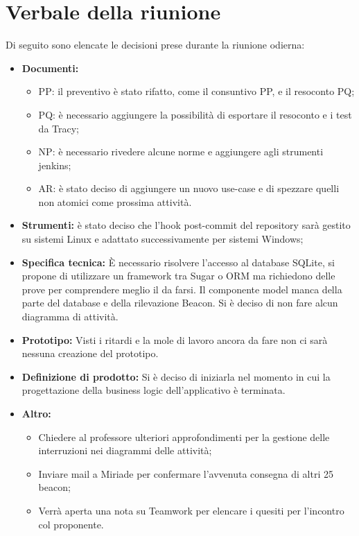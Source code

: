 \documentclass[../RiunioneInterna16-02-19.tex]{subfiles}
\begin{document}
\section{Verbale della riunione}
Di seguito sono elencate le decisioni prese durante la riunione odierna:
\begin{itemize}
\item \textbf{Documenti:}
	\begin{itemize}
		\item PP: il preventivo è stato rifatto, come il consuntivo PP, e il resoconto PQ;
		\item PQ: è necessario aggiungere la possibilità di esportare il resoconto e i test da Tracy;
		\item NP: è necessario rivedere alcune norme e aggiungere agli strumenti jenkins;
		\item AR: è stato deciso di aggiungere un nuovo use-case e di spezzare quelli non atomici come prossima attività.
	\end{itemize}		
		
\item \textbf{Strumenti:} è stato deciso che l'hook post-commit del repository sarà gestito su sistemi Linux e adattato successivamente per sistemi Windows;


\item \textbf{Specifica tecnica:}
	È necessario risolvere l'accesso al database SQLite, si propone di utilizzare un framework tra Sugar o ORM ma richiedono delle prove per comprendere meglio il da farsi.
	Il componente model manca della parte del database e della rilevazione Beacon. Si è deciso di non fare alcun diagramma di attività.
	
	
\item \textbf{Prototipo:}
	Visti i ritardi e la mole di lavoro ancora da fare non ci sarà nessuna creazione del prototipo.

\item \textbf{Definizione di prodotto:}
	Si è deciso di iniziarla nel momento in cui la progettazione della business logic dell'applicativo è terminata.
	
\item \textbf{Altro:}
	\begin{itemize}
		\item Chiedere al professore ulteriori approfondimenti per la gestione delle interruzioni nei diagrammi delle attività;
		\item Inviare mail a Miriade per confermare l'avvenuta consegna di altri 25 beacon;
		\item Verrà aperta una nota su Teamwork per elencare i quesiti per l'incontro col proponente.
	\end{itemize}
	
\end{itemize}
\end{document}
